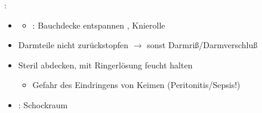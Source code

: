 \label{m:bauchtraume-offen}
: 

\begin{itemize}
  \item \TxMassVitMKBes
  \begin{itemize}
    \item {}: Bauchdecke entspannen , Knierolle
  \end{itemize}
  \item Darmteile nicht  zurückstopfen ${\rightarrow}$ sonst
  Darmriß/Darmverschluß
  \item Steril abdecken, mit Ringerlösung feucht halten
  \begin{itemize}
    \item Gefahr des Eindringens von Keimen  (Peritonitis/Sepsis!)
  \end{itemize}
  \item {}: Schockraum
\end{itemize}